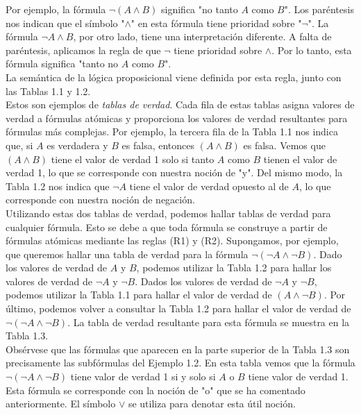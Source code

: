 \message{ !name(main.tex)}\documentclass[12pt,a4paper]{book}
\newcommand{\comillas}[1]{"#1"}
\begin{document}
    Por ejemplo, la fórmula $\neg(A\wedge B)$ significa \comillas{no tanto $A$ como $B$}. Los paréntesis nos indican que el símbolo \comillas{$\wedge$}
    en esta fórmula tiene prioridad sobre \comillas{$\neg$}. La fórmula $\neg A\wedge B$, por otro lado, tiene una interpretación diferente. A falta
    de paréntesis, aplicamos la regla de que $\neg$ tiene prioridad sobre $\wedge$. Por lo tanto, esta fórmula significa \comillas{tanto no $A$ como $B$}.\\
    La semántica de la lógica proposicional viene definida por esta regla, junto con las Tablas 1.1 y 1.2.\\
    Estos son ejemplos de \textit{tablas de verdad}. Cada fila de estas tablas asigna valores de verdad a fórmulas atómicas y proporciona
    los valores de verdad resultantes para fórmulas más complejas. Por ejemplo, la tercera fila de la Tabla 1.1 nos indica que, si
    $A$ es verdadera y $B$ es falsa, entonces $(A\wedge B)$ es falsa. Vemos que $(A\wedge B)$ tiene el valor de verdad 1 solo si tanto $A$
    como $B$ tienen el valor de verdad 1, lo que se corresponde con nuestra noción de \comillas{y}. Del mismo modo, la Tabla 1.2 nos indica
    que $\neg A$ tiene el valor de verdad opuesto al de $A$, lo que corresponde con nuestra noción de negación.\\
    Utilizando estas dos tablas de verdad, podemos hallar tablas de verdad para cualquier fórmula. Esto se debe a que toda fórmula se
    construye a partir de fórmulas atómicas mediante las reglas (R1) y (R2). Supongamos, por ejemplo, que queremos hallar una tabla de verdad para la fórmula
    $\neg(\neg A\wedge \neg B)$. Dado los valores de verdad de $A$ y $B$, podemos utilizar la Tabla 1.2 para hallar los valores de verdad de
    $\neg A$ y $\neg B$. Dados los valores de verdad de $\neg A$ y $\neg B$, podemos utilizar la Tabla 1.1 para hallar el valor de verdad de
    $(A\wedge\neg B)$. Por último, podemos volver a consultar la Tabla 1.2 para hallar el valor de verdad de $\neg(\neg A\wedge\neg B)$. La
    tabla de verdad resultante para esta fórmula se muestra en la Tabla 1.3.\\
    Obsérvese que las fórmulas que aparecen en la parte superior de la Tabla 1.3 son precisamente las subfórmulas del Ejemplo 1.2.
    En esta tabla vemos que la fórmula $\neg(\neg A\wedge \neg B)$ tiene valor de verdad 1 si y solo si $A$ o $B$ tiene valor de verdad
    1. Esta fórmula se corresponde con la noción de \comillas{o} que se ha comentado anteriormente. El símbolo $\vee$ se utiliza para
    denotar esta útil noción.
\end{document}
